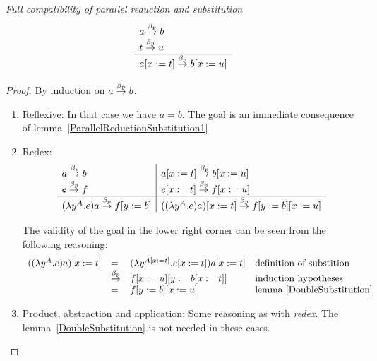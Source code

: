 \begin{lemma}
    \label{ParallelReductionSubstitution2}
    \emph{Full compatibility of parallel reduction and substitution}
    $$
    \begin{array}{l} 
        a \stackrel{\beta_p}{\to} b
        \\
        t \stackrel{\beta_p}{\to} u
     \\ \hline 
        a[x:=t] \stackrel{\beta_p}{\to} b[x:=u]
    \end{array}
    $$

    \begin{proof}
        By induction on $a \stackrel{\beta_p}{\to} b$.

        \begin{enumerate}
        \item Reflexive: In that case we have $a = b$. The goal is an immediate
        consequence of lemma~\ref{ParallelReductionSubstitution1}

        \item Redex:
        $$
        \begin{array}{l|l}
            a \stackrel{\beta_p}{\to} b
            & a[x:=t] \stackrel{\beta_p}{\to} b[x:=u]
            \\
            e \stackrel{\beta_p}{\to} f
            & e[x:=t] \stackrel{\beta_p}{\to} f[x:=u]
            \\
            \hline
            (\lambda y^A. e) a \stackrel{\beta_p}{\to} f[y:=b]
            &
            ((\lambda y^A. e) a)[x:=t] \stackrel{\beta_p}{\to} f[y:=b][x:=u]
        \end{array}
        $$

        The validity of the goal in the lower right corner can be seen from the
        following reasoning:
        $$
        \begin{array}{lllll}
            ((\lambda y^A. e) a)[x:=t]
            &=& (\lambda y^{A[x:=t]}. e[x:=t]) a[x:=t]
            &\text{definition of substition}
            \\
            &\stackrel{\beta_p}{\to}& f[x:=u][y:=b[x:=t]]
            &\text{induction hypotheses}
            \\
            &=& f[y:=b][x:=u] &\text{lemma~\ref{DoubleSubstitution}}
        \end{array}
        $$

        \item Product, abstraction and application: Some reasoning as with
        \emph{redex}. The lemma~\ref{DoubleSubstitution} is not needed in these
        cases.
        \end{enumerate}
    \end{proof}
\end{lemma}


